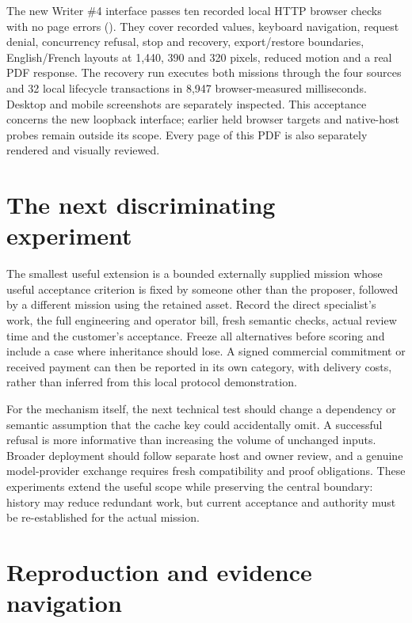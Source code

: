 \documentclass[11pt]{article}
\newcommand{\filename}[1]{\path{#1}}
\begin{document}
The new Writer \#4 interface passes ten recorded local HTTP browser checks with no page errors (\filename{evidence/interface/browser-qa.json}). They cover recorded values, keyboard navigation, request denial, concurrency refusal, stop and recovery, export/restore boundaries, English/French layouts at 1,440, 390 and 320 pixels, reduced motion and a real PDF response. The recovery run executes both missions through the four sources and 32 local lifecycle transactions in 8,947 browser-measured milliseconds. Desktop and mobile screenshots are separately inspected. This acceptance concerns the new loopback interface; earlier held browser targets and native-host probes remain outside its scope. Every page of this PDF is also separately rendered and visually reviewed.

\section{The next discriminating experiment}

The smallest useful extension is a bounded externally supplied mission whose useful acceptance criterion is fixed by someone other than the proposer, followed by a different mission using the retained asset. Record the direct specialist's work, the full engineering and operator bill, fresh semantic checks, actual review time and the customer's acceptance. Freeze all alternatives before scoring and include a case where inheritance should lose. A signed commercial commitment or received payment can then be reported in its own category, with delivery costs, rather than inferred from this local protocol demonstration.

For the mechanism itself, the next technical test should change a dependency or semantic assumption that the cache key could accidentally omit. A successful refusal is more informative than increasing the volume of unchanged inputs. Broader deployment should follow separate host and owner review, and a genuine model-provider exchange requires fresh compatibility and proof obligations. These experiments extend the useful scope while preserving the central boundary: history may reduce redundant work, but current acceptance and authority must be re-established for the actual mission.



\section{Reproduction and evidence navigation}
\end{document}
